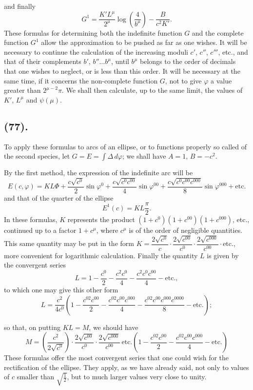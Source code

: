 \documentclass{article}
\begin{document}
and finally
\[ G^{1}=\frac{K'L^{\mu}}{2^{\mu}}\log\left(\frac{4}{b^{\mu}}\right)-\frac{B}{c^{2}K'}. \]
These formulas for determining both the indefinite function $G$ and the complete function $G^{1}$ allow the approximation to be pushed as far as one wishes. It will be necessary to continue the calculation of the increasing moduli $c'$, $c''$, $c'''$, etc., and that of their complements $b'$, $b''\ldots b^{\mu}$, until $b^{\mu}$ belongs to the order of decimals that one wishes to neglect, or is less than this order. It will be necessary at the same time, if it concerns the non-complete function $G$, not to give $\varphi$ a value greater than $2^{\mu-2}\pi$. We shall then calculate, up to the same limit, the values of $K'$, $L^{\mu}$ and $\psi(\mu)$.

\subsection*{(77).}

To apply these formulas to arcs of an ellipse, or to functions properly so called of the second species, let $G=E=\displaystyle\int\Delta\,d\varphi$; we shall have $A=1$, $B=-c^{2}$.

By the first method, the expression of the indefinite arc will be
\[ E(c,\varphi)=KL\Phi+\frac{c\sqrt{c^{0}}}{2}\sin\varphi^{0}+\frac{c\sqrt{c^{0}c^{00}}}{4}\sin\varphi^{00}+\frac{c\sqrt{c^{0}c^{00}c^{000}}}{8}\sin\varphi^{000}+\text{etc.} \]
and that of the quarter of the ellipse
\[ E^{1}(c)=KL\frac{\pi}{2}. \]
In these formulas, $K$ represents the product $(1+c^{0})(1+c^{00})(1+c^{000})$, etc., continued up to a factor $1+c^{\mu}$, where $c^{\mu}$ is of the order of negligible quantities. This same quantity may be put in the form $K=\dfrac{2\sqrt{c^{0}}}{c}\cdot\dfrac{2\sqrt{c^{00}}}{c^{0}}\cdot\dfrac{2\sqrt{c^{000}}}{c^{00}}\cdot\text{etc.}$, more convenient for logarithmic calculation. Finally the quantity $L$ is given by the convergent series
\[ L=1-\frac{c^{0}}{2}-\frac{c^{2}c^{0}}{4}-\frac{c^{2}c^{0}c^{00}}{4}-\text{etc.}, \]
to which one may give this other form
\[ L=\frac{c^{2}}{4c^{0}}\left(1-\frac{c^{02}c^{00}}{2}-\frac{c^{02}c^{00}c^{000}}{4}-\frac{c^{02}c^{00}c^{000}c^{0000}}{8}-\text{etc.}\right); \]

so that, on putting $KL=M$, we should have
\[ M=\left(\frac{c^{2}}{2\sqrt{c^{0}}}\right)\cdot\frac{2\sqrt{c^{00}}}{c^{0}}\cdot\frac{2\sqrt{c^{000}}}{c^{00}}\,\text{etc.}\left(1-\frac{c^{02}c^{00}}{2}-\frac{c^{02}c^{00}c^{000}}{4}-\text{etc.}\right) \]
These formulas offer the most convergent series that one could wish for the rectification of the ellipse. They apply, as we have already said, not only to values of $c$ smaller than $\sqrt{\frac{1}{2}}$, but to much larger values very close to unity.
\end{document}
